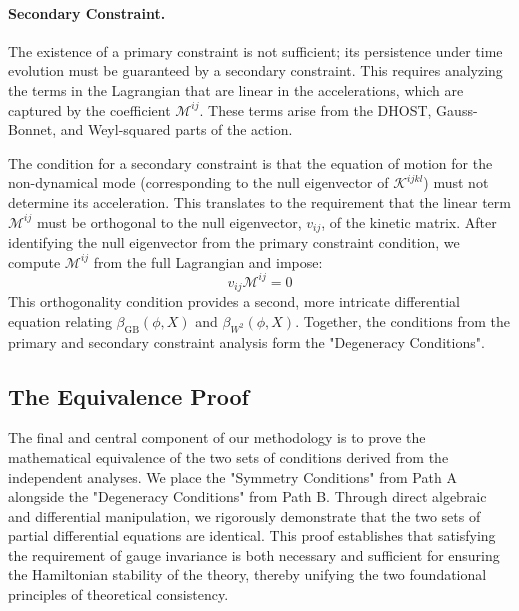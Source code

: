 \documentclass[twocolumn]{aastex631}
\begin{document}
\paragraph{Secondary Constraint.} The existence of a primary constraint is not sufficient; its persistence under time evolution must be guaranteed by a secondary constraint. This requires analyzing the terms in the Lagrangian that are linear in the accelerations, which are captured by the coefficient $\mathcal{M}^{ij}$. These terms arise from the DHOST, Gauss-Bonnet, and Weyl-squared parts of the action.

The condition for a secondary constraint is that the equation of motion for the non-dynamical mode (corresponding to the null eigenvector of $\mathcal{K}^{ijkl}$) must not determine its acceleration. This translates to the requirement that the linear term $\mathcal{M}^{ij}$ must be orthogonal to the null eigenvector, $v_{ij}$, of the kinetic matrix. After identifying the null eigenvector from the primary constraint condition, we compute $\mathcal{M}^{ij}$ from the full Lagrangian and impose:
\begin{equation}
v_{ij}\mathcal{M}^{ij} = 0
\end{equation}
This orthogonality condition provides a second, more intricate differential equation relating $\beta_{\text{GB}}(\phi, X)$ and $\beta_{W^2}(\phi, X)$. Together, the conditions from the primary and secondary constraint analysis form the "Degeneracy Conditions".

\subsection{The Equivalence Proof}
The final and central component of our methodology is to prove the mathematical equivalence of the two sets of conditions derived from the independent analyses. We place the "Symmetry Conditions" from Path A alongside the "Degeneracy Conditions" from Path B. Through direct algebraic and differential manipulation, we rigorously demonstrate that the two sets of partial differential equations are identical. This proof establishes that satisfying the requirement of gauge invariance is both necessary and sufficient for ensuring the Hamiltonian stability of the theory, thereby unifying the two foundational principles of theoretical consistency.
\end{document}
